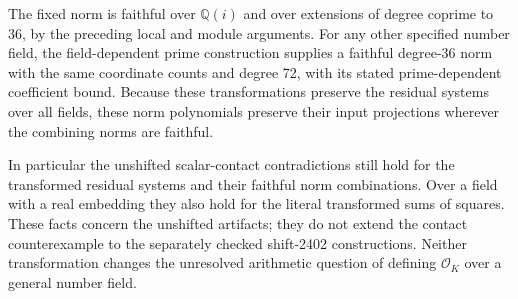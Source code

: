 The fixed norm is faithful over $\mathbb Q(i)$ and over
extensions of degree coprime to 36, by the preceding local
and module arguments.  For any other specified number field,
the field-dependent prime construction supplies a faithful
degree-36 norm with the same coordinate counts and degree
72, with its stated prime-dependent coefficient bound.
Because these transformations preserve the residual
systems over all fields, these norm polynomials preserve
their input projections wherever the combining norms are
faithful.

In particular the unshifted scalar-contact contradictions
still hold for the transformed residual systems and their
faithful norm combinations.  Over a field with a real
embedding they also hold for the literal transformed sums
of squares.  These facts concern the unshifted artifacts;
they do not extend the contact counterexample to the
separately checked shift-2402 constructions.  Neither
transformation changes the unresolved arithmetic question
of defining $\mathcal O_K$ over a general number field.
